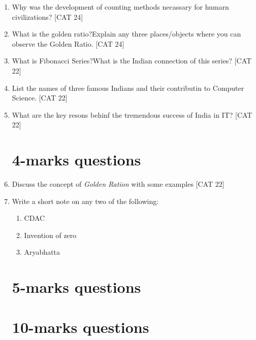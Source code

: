 \documentclass[12pt]{article}
\begin{document}
\begin{enumerate}
			\item Why was the development of counting methods necassary for humarn civilizations? \hfill{[CAT 24]}
			
			\item What is the golden ratio?Explain any three places/objects where you can observe the Golden Ratio. \hfill{[CAT 24]}
			
			\item What is Fibonacci Series?What is the Indian connection of this series? \hfill{[CAT 22]}
			
			\item List the names of three famous Indians and their contributin to Computer Science. \hfill{[CAT 22]}
			
			\item What are the key resons behinf the tremendous success of India in IT? \hfill{[CAT 22]}
			
			
			
			
		\section{4-marks questions}
			\item Discuss the concept of \textit{Golden Ration} with some examples \hfill{[CAT 22]}
			
			\item Write a short note on any two of the following:
			\begin{enumerate}
				\item CDAC
				\item Invention of zero
				\item Aryabhatta
			\end{enumerate}
			
			
			
			
			
			
			
			
			
			
		\section{5-marks questions}
		
		
		
		
		
		
		
		
		
		
		
		\section{10-marks questions}
		

\end{enumerate}
\end{document}
